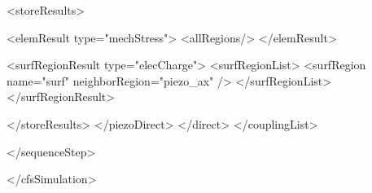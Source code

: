{\begin{xmllisting}
          <storeResults>

            <elemResult type="mechStress">
              <allRegions/>
            </elemResult>

            <surfRegionResult type="elecCharge"> 
              <surfRegionList>
                <surfRegion name="surf" neighborRegion="piezo_ax" />
              </surfRegionList>
            </surfRegionResult>
            
          </storeResults> 
        </piezoDirect>
      </direct>
    </couplingList>

  </sequenceStep>
  
</cfsSimulation>
\end{xmllisting}
}



%
%




